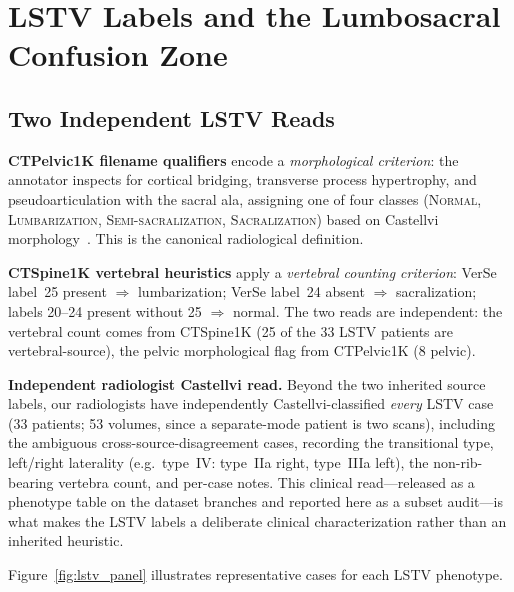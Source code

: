 \documentclass[pmlr]{jmlr}
\begin{document}
\section{LSTV Labels and the Lumbosacral Confusion Zone}
\label{sec:lstv_arbitration}

\subsection{Two Independent LSTV Reads}

\textbf{CTPelvic1K filename qualifiers} encode a
\emph{morphological criterion}: the annotator inspects for cortical
bridging, transverse process hypertrophy, and pseudoarticulation
with the sacral ala, assigning one of four classes (\textsc{Normal},
\textsc{Lumbarization}, \textsc{Semi-sacralization},
\textsc{Sacralization}) based on Castellvi
morphology~\citep{Castellvi1984LumbosacralDefects}.
This is the canonical radiological definition.

\textbf{CTSpine1K vertebral heuristics} apply a
\emph{vertebral counting criterion}: VerSe label~25 present
$\Rightarrow$ lumbarization; VerSe label~24 absent $\Rightarrow$
sacralization; labels 20--24 present without 25 $\Rightarrow$ normal.
The two reads are independent: the vertebral count comes from
CTSpine1K (25 of the 33 LSTV patients are vertebral-source), the
pelvic morphological flag from CTPelvic1K (8 pelvic).

\textbf{Independent radiologist Castellvi read.}
Beyond the two inherited source labels, our radiologists have
independently Castellvi-classified \emph{every} LSTV case
(33 patients; 53 volumes, since a separate-mode patient is two
scans), including the ambiguous cross-source-disagreement cases,
recording the transitional type, left/right laterality (e.g.\
type~IV: type~IIa right, type~IIIa left), the non-rib-bearing
vertebra count, and per-case notes. This clinical read---released as
a phenotype table on the dataset branches and reported here as a
subset audit---is what makes the LSTV labels a deliberate clinical
characterization rather than an inherited heuristic.

Figure~\ref{fig:lstv_panel} illustrates representative cases for
each LSTV phenotype.
\end{document}
